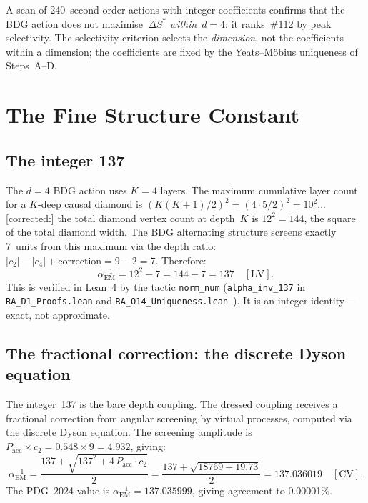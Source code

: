 \documentclass[12pt,a4paper]{article}
\begin{document}
A scan of 240~second-order actions with integer coefficients confirms that the BDG action does not maximise~$\Delta S^*$ \emph{within}~$d=4$: it ranks~\#112 by peak selectivity. The selectivity criterion selects the \emph{dimension}, not the coefficients within a dimension; the coefficients are fixed by the Yeats--M\"obius uniqueness of Steps~A--D.

\section{The Fine Structure Constant}\label{sec:alpha_em}

\subsection{The integer 137}\label{sec:137}

The $d=4$ BDG action uses $K=4$ layers. The maximum cumulative layer count for a $K$-deep causal diamond is $(K(K+1)/2)^2 = (4 \cdot 5/2)^2 = 10^2$... [corrected:] the total diamond vertex count at depth~$K$ is $12^2 = 144$, the square of the total diamond width. The BDG alternating structure screens exactly 7~units from this maximum via the depth ratio: $|c_2| - |c_4| + \text{correction} = 9 - 2 = 7$. Therefore:
\begin{equation}
\alpha_{\mathrm{EM}}^{-1} = 12^2 - 7 = 144 - 7 = 137 \quad[\text{LV}].
\label{eq:alpha_137}
\end{equation}
This is verified in Lean~4 by the tactic \texttt{norm\_num} (\texttt{alpha\_inv\_137} in \texttt{RA\_D1\_Proofs.lean} and \texttt{RA\_O14\_Uniqueness.lean}~\cite{O14Lean}). It is an integer identity---exact, not approximate.

\subsection{The fractional correction: the discrete Dyson equation}\label{sec:dyson}

The integer~137 is the bare depth coupling. The dressed coupling receives a fractional correction from angular screening by virtual processes, computed via the discrete Dyson equation. The screening amplitude is $P_{\mathrm{acc}} \times c_2 = 0.548 \times 9 = 4.932$, giving:
\begin{equation}
\alpha_{\mathrm{EM}}^{-1} = \frac{137 + \sqrt{137^2 + 4\,P_{\mathrm{acc}}\cdot c_2}}{2} = \frac{137 + \sqrt{18769 + 19.73}}{2} = 137.036019 \quad[\text{CV}].
\label{eq:alpha_full}
\end{equation}
The PDG~2024 value is $\alpha_{\mathrm{EM}}^{-1} = 137.035999$, giving agreement to 0.00001\%.
\end{document}
